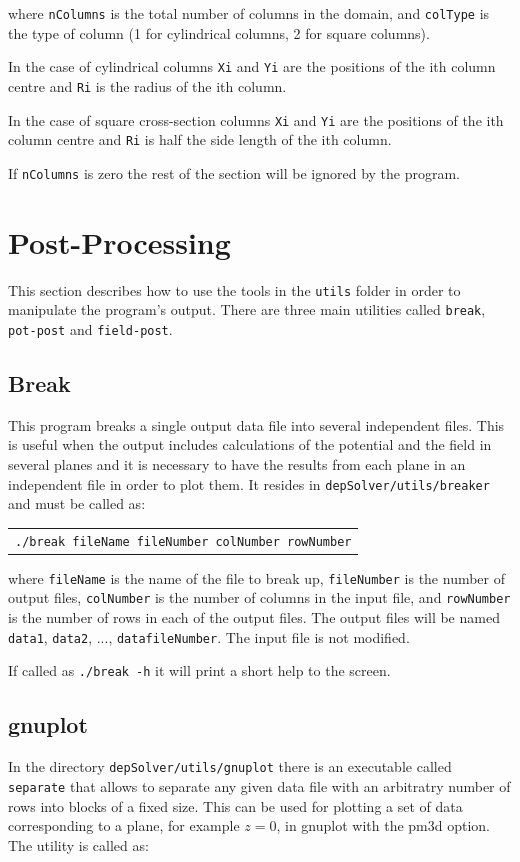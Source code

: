 \documentclass[12pt]{article}
\begin{document}
where \verb+nColumns+ is the total number of columns in the domain, and \verb+colType+ is the type of column (1 for cylindrical columns, 2 for square columns).

In the case of cylindrical columns \verb+Xi+ and \verb+Yi+ are the positions of the ith column centre and \verb+Ri+ is the radius of the ith column.

In the case of square cross-section columns \verb+Xi+ and \verb+Yi+ are the positions of the ith column centre and \verb+Ri+ is half the side length of the ith column.

If \verb+nColumns+ is zero the rest of the section will be ignored by the program.

\pagebreak

\section{Post-Processing}
This section describes how to use the tools in the \verb+utils+ folder in order to manipulate the program's output. There are three main utilities called \verb+break+, \verb+pot-post+ and \verb+field-post+.

\subsection{Break}\label{break}
This program breaks a single output data file into several independent files. This is useful when the output includes calculations of the potential and the field in several planes and it is necessary to have the results from each plane in an independent file in order to plot them. It resides in \verb+depSolver/utils/breaker+ and must be called as:

\begin{tabular}{l}
\texttt{./break fileName fileNumber colNumber rowNumber}
\end{tabular}

where \verb+fileName+ is the name of the file to break up, \verb+fileNumber+ is the number of output files, \verb+colNumber+ is the number of columns in the input file, and \verb+rowNumber+ is the number of rows in each of the output files. The output files will be named \verb+data1+, \verb+data2+, ..., \verb+datafileNumber+. The input file is not modified.

If called as \verb+./break -h+ it will print a short help to the screen.

\subsection{gnuplot}
In the directory \verb+depSolver/utils/gnuplot+ there is an executable called \verb+separate+ that allows to separate any given data file with an arbitratry number of rows into blocks of a fixed size. This can be used for plotting a set of data corresponding to a plane, for example $z=0$, in gnuplot with the pm3d option. The utility is called as:
\end{document}
